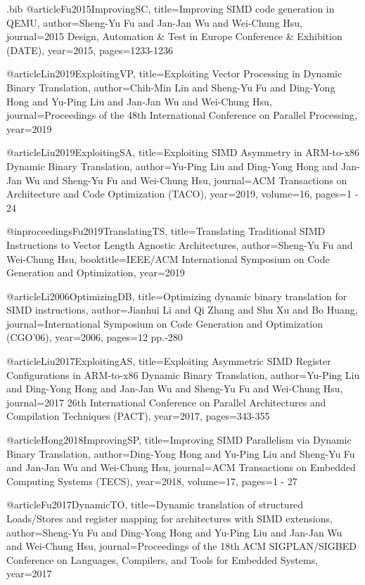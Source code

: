 \begin{filecontents}{\jobname.bib}
@article{Fu2015ImprovingSC,
  title={Improving SIMD code generation in QEMU},
  author={Sheng-Yu Fu and Jan-Jan Wu and Wei-Chung Hsu},
  journal={2015 Design, Automation \& Test in Europe Conference \& Exhibition (DATE)},
  year={2015},
  pages={1233-1236}
}

@article{Lin2019ExploitingVP,
  title={Exploiting Vector Processing in Dynamic Binary Translation},
  author={Chih-Min Lin and Sheng-Yu Fu and Ding-Yong Hong and Yu-Ping Liu and Jan-Jan Wu and Wei-Chung Hsu},
  journal={Proceedings of the 48th International Conference on Parallel Processing},
  year={2019}
}

@article{Liu2019ExploitingSA,
  title={Exploiting SIMD Asymmetry in ARM-to-x86 Dynamic Binary Translation},
  author={Yu-Ping Liu and Ding-Yong Hong and Jan-Jan Wu and Sheng-Yu Fu and Wei-Chung Hsu},
  journal={ACM Transactions on Architecture and Code Optimization (TACO)},
  year={2019},
  volume={16},
  pages={1 - 24}
}

@inproceedings{Fu2019TranslatingTS,
  title={Translating Traditional SIMD Instructions to Vector Length Agnostic Architectures},
  author={Sheng-Yu Fu and Wei-Chung Hsu},
  booktitle={IEEE/ACM International Symposium on Code Generation and Optimization},
  year={2019}
}

@article{Li2006OptimizingDB,
  title={Optimizing dynamic binary translation for SIMD instructions},
  author={Jianhui Li and Qi Zhang and Shu Xu and Bo Huang},
  journal={International Symposium on Code Generation and Optimization (CGO'06)},
  year={2006},
  pages={12 pp.-280}
}

@article{Liu2017ExploitingAS,
  title={Exploiting Asymmetric SIMD Register Configurations in ARM-to-x86 Dynamic Binary Translation},
  author={Yu-Ping Liu and Ding-Yong Hong and Jan-Jan Wu and Sheng-Yu Fu and Wei-Chung Hsu},
  journal={2017 26th International Conference on Parallel Architectures and Compilation Techniques (PACT)},
  year={2017},
  pages={343-355}
}

@article{Hong2018ImprovingSP,
  title={Improving SIMD Parallelism via Dynamic Binary Translation},
  author={Ding-Yong Hong and Yu-Ping Liu and Sheng-Yu Fu and Jan-Jan Wu and Wei-Chung Hsu},
  journal={ACM Transactions on Embedded Computing Systems (TECS)},
  year={2018},
  volume={17},
  pages={1 - 27}
}

@article{Fu2017DynamicTO,
  title={Dynamic translation of structured Loads/Stores and register mapping for architectures with SIMD extensions},
  author={Sheng-Yu Fu and Ding-Yong Hong and Yu-Ping Liu and Jan-Jan Wu and Wei-Chung Hsu},
  journal={Proceedings of the 18th ACM SIGPLAN/SIGBED Conference on Languages, Compilers, and Tools for Embedded Systems},
  year={2017}
}


\end{filecontents}
